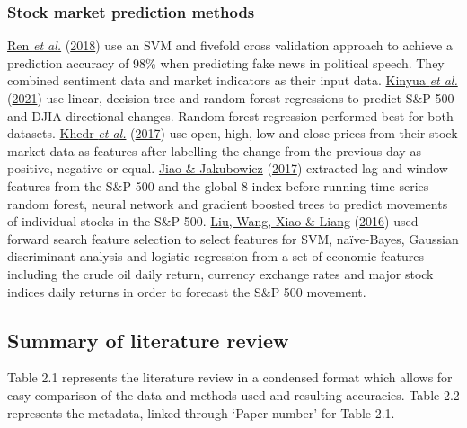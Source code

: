 \documentclass[11pt,preprint, authoryear]{elsarticle}
\numberwithin{equation}{section}
\numberwithin{figure}{section}
\numberwithin{table}{section}
\begin{document}
\hypertarget{stock-market-prediction-methods}{%
\subsubsection{Stock market prediction
methods}\label{stock-market-prediction-methods}}

\protect\hyperlink{ref-ren2018forecasting}{Ren \emph{et al.}}
(\protect\hyperlink{ref-ren2018forecasting}{2018}) use an SVM and
fivefold cross validation approach to achieve a prediction accuracy of
98\% when predicting fake news in political speech. They combined
sentiment data and market indicators as their input data.
\protect\hyperlink{ref-kinyua2021analysis}{Kinyua \emph{et al.}}
(\protect\hyperlink{ref-kinyua2021analysis}{2021}) use linear, decision
tree and random forest regressions to predict S\&P 500 and DJIA
directional changes. Random forest regression performed best for both
datasets. \protect\hyperlink{ref-khedr2017predicting}{Khedr \emph{et
al.}} (\protect\hyperlink{ref-khedr2017predicting}{2017}) use open,
high, low and close prices from their stock market data as features
after labelling the change from the previous day as positive, negative
or equal. \protect\hyperlink{ref-jiao2017predicting}{Jiao \& Jakubowicz}
(\protect\hyperlink{ref-jiao2017predicting}{2017}) extracted lag and
window features from the S\&P 500 and the global 8 index before running
time series random forest, neural network and gradient boosted trees to
predict movements of individual stocks in the S\&P 500.
\protect\hyperlink{ref-liu2016forecasting}{Liu, Wang, Xiao \& Liang}
(\protect\hyperlink{ref-liu2016forecasting}{2016}) used forward search
feature selection to select features for SVM, naïve-Bayes, Gaussian
discriminant analysis and logistic regression from a set of economic
features including the crude oil daily return, currency exchange rates
and major stock indices daily returns in order to forecast the S\&P 500
movement.

\hypertarget{summary-of-literature-review}{%
\subsection{Summary of literature
review}\label{summary-of-literature-review}}

Table 2.1 represents the literature review in a condensed format which
allows for easy comparison of the data and methods used and resulting
accuracies. Table 2.2 represents the metadata, linked through `Paper
number' for Table 2.1.
\end{document}

